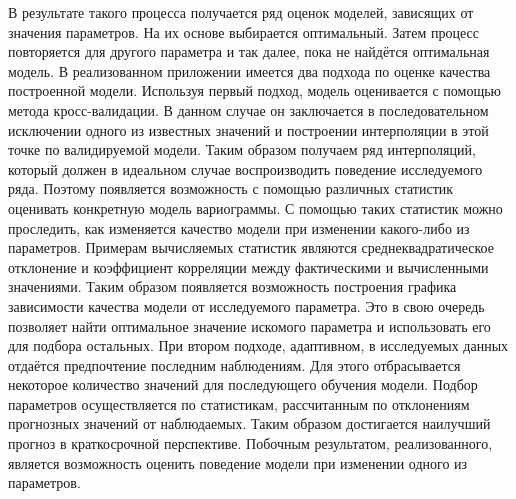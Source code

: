 В результате такого процесса получается ряд оценок моделей, зависящих от значения параметров. На их основе выбирается оптимальный. Затем процесс повторяется для другого параметра и так далее, пока не найдётся оптимальная модель. В реализованном приложении имеется два подхода по оценке качества построенной модели. Используя первый подход, модель оценивается с помощью метода кросс-валидации. В данном случае он заключается в последовательном исключении одного из известных значений и построении интерполяции в этой точке по валидируемой модели. Таким образом получаем ряд интерполяций, который должен в идеальном случае воспроизводить поведение исследуемого ряда. Поэтому появляется возможность с помощью различных статистик оценивать конкретную модель вариограммы. С помощью таких статистик можно проследить, как изменяется качество модели при изменении какого-либо из параметров. Примерам вычисляемых статистик являются среднеквадратическое отклонение и коэффициент корреляции между фактическими и вычисленными значениями. Таким образом появляется возможность построения графика зависимости качества модели от исследуемого параметра. Это в свою очередь позволяет найти оптимальное значение искомого параметра и использовать его для подбора остальных. При втором подходе, адаптивном, в исследуемых данных отдаётся предпочтение последним наблюдениям. Для этого отбрасывается некоторое количество значений для последующего обучения модели. Подбор параметров осуществляется по статистикам, рассчитанным по отклонениям прогнозных значений от наблюдаемых. Таким образом достигается наилучший прогноз в краткосрочной перспективе. Побочным результатом, реализованного, является возможность оценить поведение модели при изменении одного из параметров.

